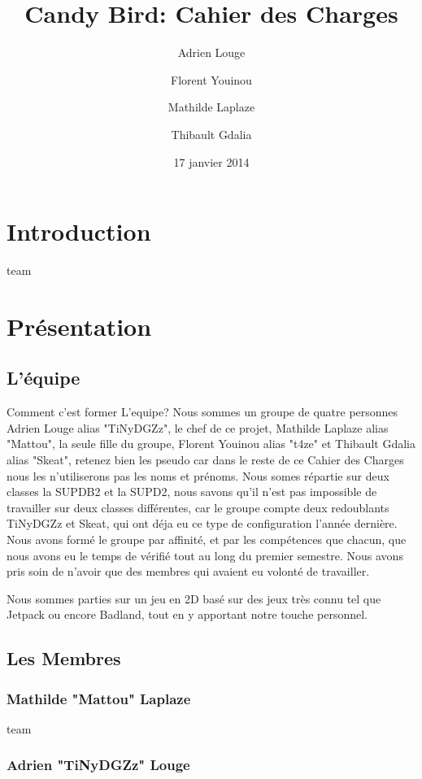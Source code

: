\documentclass [11pt]{report}
\title {\textbf{ {Candy Bird: Cahier des Charges}}}
\author{Adrien Louge \and Florent Youinou \and Mathilde Laplaze \and Thibault Gdalia}
\date{17 janvier 2014}
\begin{document}
\renewcommand{\baselinestretch}{0.001}
\maketitle
\tableofcontents

\chapter {Introduction}
\vfill
team

\chapter {Pr\'esentation}
	\section{ L'\'equipe }
	Comment c'est former L'equipe?
	Nous sommes un groupe de quatre personnes Adrien Louge alias "TiNyDGZz", le chef de ce projet, Mathilde Laplaze alias "Mattou", la seule fille du groupe, Florent Youinou alias "t4ze" et Thibault Gdalia alias "Skeat", retenez bien les pseudo car dans le reste de ce Cahier des Charges nous les n'utiliserons pas les noms et pr\'enoms. Nous 		somes r\'epartie sur deux classes la SUPDB2 et la SUPD2, nous savons qu'il n'est pas impossible de travailler sur deux classes diff\'erentes, car le groupe compte deux redoublants TiNyDGZz et Skeat, qui ont d\'eja eu ce type de configuration l'ann\'ee derni\`ere. Nous avons form\'e le groupe par affinit\'e, et par les comp\'etences que 		chacun, que nous avons eu le temps de v\'erifi\'e tout au long du premier semestre. Nous avons pris soin de n'avoir que des membres qui avaient eu volont\'e de travailler. 
	
	Nous sommes parties sur un jeu en 2D bas\'e sur des jeux tr\`es connu tel que Jetpack ou encore Badland, tout en y apportant notre touche personnel.
	\section { Les Membres }
		\subsection {Mathilde "Mattou" Laplaze}
	
		\vfill
		team
		\newpage
		\subsection {Adrien "TiNyDGZz" Louge}
	
\end{document}
